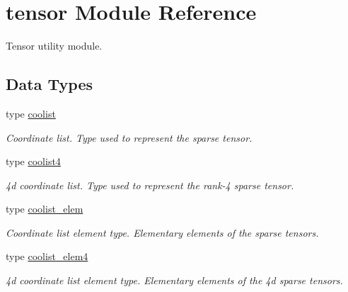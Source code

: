 \hypertarget{namespacetensor}{}\section{tensor Module Reference}
\label{namespacetensor}


Tensor utility module.  


\subsection*{Data Types}
\begin{DoxyCompactItemize}
\item 
type \hyperlink{structtensor_1_1coolist}{coolist}
\begin{DoxyCompactList}\small\item\em Coordinate list. Type used to represent the sparse tensor. \end{DoxyCompactList}\item 
type \hyperlink{structtensor_1_1coolist4}{coolist4}
\begin{DoxyCompactList}\small\item\em 4d coordinate list. Type used to represent the rank-\/4 sparse tensor. \end{DoxyCompactList}\item 
type \hyperlink{structtensor_1_1coolist__elem}{coolist\+\_\+elem}
\begin{DoxyCompactList}\small\item\em Coordinate list element type. Elementary elements of the sparse tensors. \end{DoxyCompactList}\item 
type \hyperlink{structtensor_1_1coolist__elem4}{coolist\+\_\+elem4}
\begin{DoxyCompactList}\small\item\em 4d coordinate list element type. Elementary elements of the 4d sparse tensors. \end{DoxyCompactList}\end{DoxyCompactItemize}
